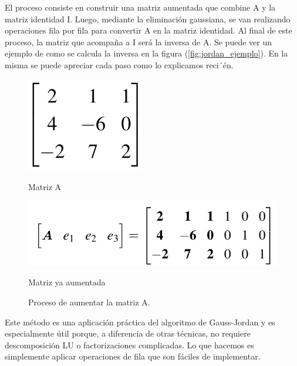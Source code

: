 El proceso consiste en construir una matriz aumentada que combine A y la matriz identidad I. Luego, mediante la eliminación gaussiana, se van realizando operaciones fila por fila para convertir A en la matriz identidad. Al final de este proceso, la matriz que acompaña a I será la inversa de A. Se puede ver un ejemplo de como se calcula la inversa en la figura (\ref{fig:jordan_ejemplo}). En la misma se puede apreciar cada paso como lo explicamos reci´én.

\begin{figure}[H]
    \centering
    \begin{minipage}{0.15\linewidth}
        \includegraphics[width=\linewidth]{img/matriz-a-aumentar.png}
        \caption{Matriz A}
    \end{minipage}
  \begin{minipage}{0.3\linewidth}
      \includegraphics[width=\linewidth]{img/matriz-aumentada.png}
      \caption{Matriz ya aumentada}
  \end{minipage}
  \caption{Proceso de aumentar la matriz A.}
  \label{fig:aumentada}
\end{figure}

Este método es una aplicación práctica del algoritmo de Gauss-Jordan y es especialmente útil porque, a diferencia de otras técnicas, no requiere descomposición LU o factorizaciones complicadas. Lo que hacemos es simplemente aplicar operaciones de fila que son fáciles de implementar.

